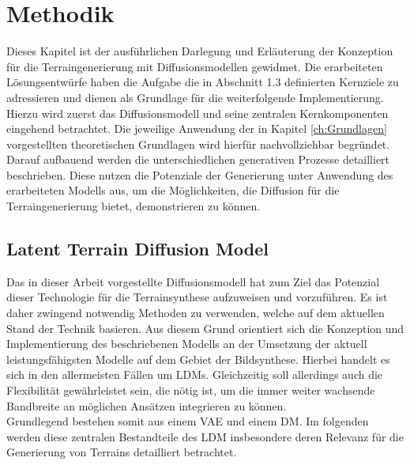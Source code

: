 \chapter{Methodik}

Dieses Kapitel ist der ausführlichen Darlegung und Erläuterung der Konzeption für die Terraingenerierung mit Diffusionsmodellen gewidmet. Die erarbeiteten Lösungsentwürfe haben die Aufgabe die in Abschnitt 1.3 definierten Kernziele zu adressieren und dienen als Grundlage für die weiterfolgende Implementierung. \\
Hierzu wird zuerst das Diffusionsmodell und seine zentralen Kernkomponenten eingehend betrachtet. Die jeweilige Anwendung der in Kapitel \ref{ch:Grundlagen} vorgestellten theoretischen Grundlagen wird hierfür nachvollziehbar begründet. \\
Darauf aufbauend werden die unterschiedlichen generativen Prozesse detailliert beschrieben. Diese nutzen die Potenziale der Generierung unter Anwendung des erarbeiteten Modells aus, um die Möglichkeiten, die Diffusion für die Terraingenerierung bietet, demonstrieren zu können.

\section {Latent Terrain Diffusion Model}

Das in dieser Arbeit vorgestellte Diffusionsmodell hat zum Ziel das Potenzial dieser Technologie für die Terrainsynthese aufzuweisen und vorzuführen. Es ist daher zwingend notwendig Methoden zu verwenden, welche auf dem aktuellen Stand der Technik basieren. Aus diesem Grund orientiert sich die Konzeption und Implementierung des beschriebenen Modells an der Umsetzung der aktuell leistungsfähigsten Modelle auf dem Gebiet der Bildsynthese. Hierbei handelt es sich in den allermeisten Fällen um LDMs. Gleichzeitig soll allerdings auch die Flexibilität gewährleistet sein, die nötig ist, um die immer weiter wachsende Bandbreite an möglichen Ansätzen integrieren zu können.\\
Grundlegend bestehen somit aus einem \ac{VAE} und einem \ac{DM}. Im folgenden werden diese zentralen Bestandteile des LDM insbesondere deren Relevanz für die Generierung von Terrains detailliert betrachtet.

